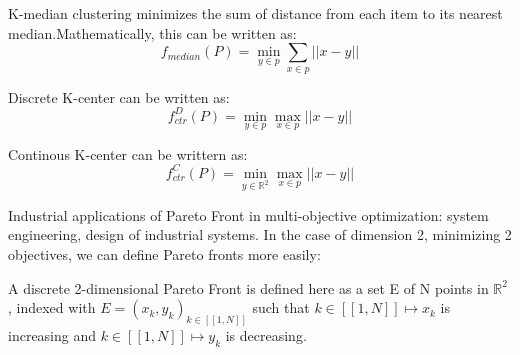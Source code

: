 \documentclass{meta}
\def\RR{{\mathbb{R}}}
\begin{document}
K-median clustering minimizes the sum of distance from each item to its nearest median.Mathematically, this can be written as:
\begin{equation}\label{defKmeidan}
f_{median}(P) = \min_{y \in p} 
\sum_{x \in p} \left|\!\left| x - y \right|\!\right|
\end{equation}

Discrete K-center can be written as:
\begin{equation}\label{defKcenterD}
f_{ctr}^D (P) = \min_{y \in p} 
\max_{x \in p} \left|\!\left| x - y \right|\!\right|
\end{equation}

Continous K-center can be writtern as:
\begin{equation}\label{defKcenterC}
f_{ctr}^C (P) = \min_{y \in \RR^2 } 
\max_{x \in p} \left|\!\left| x - y \right|\!\right|
\end{equation}


Industrial applications of Pareto Front in multi-objective optimization: system engineering, design of industrial systems.
In the case of dimension 2, minimizing 2 objectives, we can define Pareto fronts more easily:

A discrete 2-dimensional Pareto Front is defined here as a set E of N points in $\RR^2$ , indexed with $E = {(x_k,y_k)}_{k \in [\![1,N]\!]}$
such that 
$k \in [\![1,N]\!] \mapsto x_k$ is increasing and $k \in [\![1,N]\!] \mapsto y_k$ is decreasing.
\end{document}
